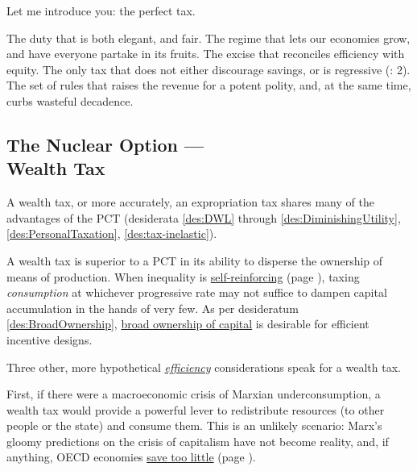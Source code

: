 Let me introduce you: the perfect tax. 

The duty that is both elegant, and fair. The regime that lets our economies grow, and have everyone partake in its fruits. The excise that reconciles efficiency with equity. The only tax that does not either discourage savings, or is regressive (\citealt{Seidman1997}: 2). The set of rules that raises the revenue for a potent polity, and, at the same time, curbs wasteful decadence. 

\subsection[Wealth Tax]{The Nuclear Option ---\\Wealth Tax} \label{sec:ScoreWT} A wealth tax, or more accurately, an expropriation tax shares many of the advantages of the PCT (desiderata \ref{des:DWL} through \ref{des:DiminishingUtility}, \ref{des:PersonalTaxation}, \ref{des:tax-inelastic}).

A wealth tax is superior to a PCT in its ability to disperse the ownership of means of production. When inequality is \hyperref[sec:GovDynofIneq]{self-reinforcing} (page \pageref{sec:GovDynofIneq}), taxing \emph{consumption} at whichever progressive rate may not suffice to dampen capital accumulation in the hands of very few. As per desideratum \ref{des:BroadOwnership}, \hyperref[des:BroadOwnership]{broad ownership of capital} is desirable for efficient incentive designs. %

Three other, more hypothetical \hyperref[sec:Efficiency]{\emph{efficiency}} considerations speak for a wealth tax. 

First, if there were a macroeconomic crisis of Marxian %
underconsumption, a wealth tax would provide a powerful lever to redistribute resources (to other people or the state) and consume them. This is an unlikely scenario: Marx's gloomy predictions on the crisis of capitalism have not become reality, and, if anything, OECD economies \hyperref[des:Savings]{save too little} (page \pageref{des:Savings}). %

